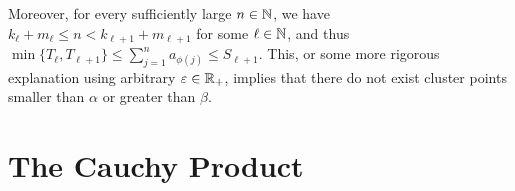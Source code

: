 \documentclass[../MAS242_Note.tex]{subfiles}
\begin{document}
{    Moreover, for every sufficiently large \(n \in \NN\), we have
    \(k_\ell + m_\ell \le n < k_{\ell+1} + m_{\ell+1}\) for some \(\ell \in \NN\), and thus
    \(\min \{T_\ell, T_{\ell+1}\} \le \sum_{j=1}^{n} a_{\phi(j)} \le S_{\ell+1}\).
    This, or some more rigorous explanation using arbitrary \(\veps \in \RR_+\),
    implies that there do not exist cluster points smaller than \(\alpha\) or greater than \(\beta\).
}

\section{The Cauchy Product}

\end{document}
